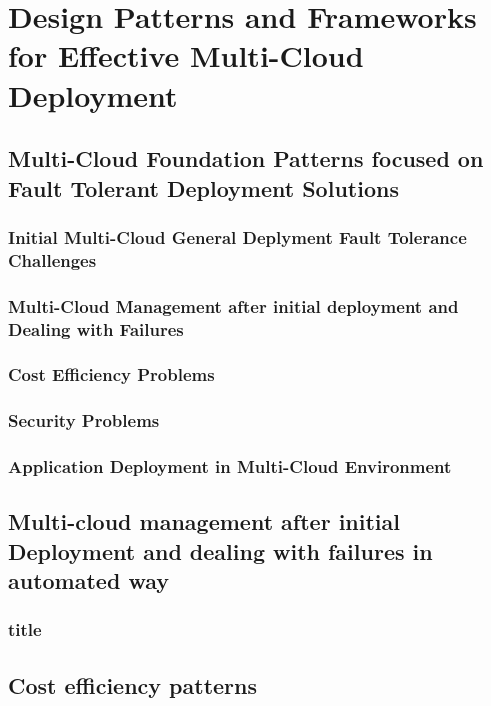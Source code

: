 \documentclass[12pt]{article}
\begin{document}
	\section{Design Patterns and Frameworks for Effective Multi-Cloud Deployment}
	
	\subsection{Multi-Cloud Foundation Patterns focused on Fault Tolerant Deployment Solutions}	

	\subsubsection{Initial Multi-Cloud General Deplyment Fault Tolerance Challenges}
	
	\subsubsection{Multi-Cloud Management after initial deployment and Dealing with Failures}
	
	\subsubsection{Cost Efficiency Problems}
	
	\subsubsection{Security Problems}
	
	\subsubsection{Application Deployment in Multi-Cloud Environment}
	
	\subsection{Multi-cloud management after initial Deployment and dealing with failures in automated way}
	
	\subsubsection{title}
	
	\subsection{Cost efficiency patterns}
\end{document}
